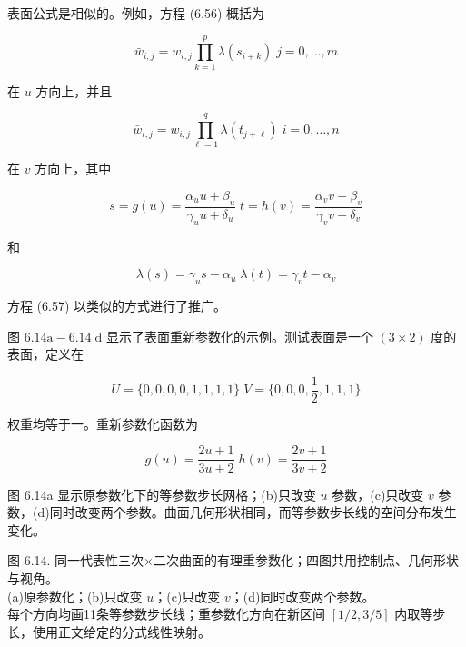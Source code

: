 \documentclass[../main.tex]{subfiles}
\begin{document}
表面公式是相似的。例如，方程 (6.56) 概括为

\[
{\bar{w}}_{i,j} = {w}_{i,j}\mathop{\prod }\limits_{{k = 1}}^{p}\lambda \left( {s}_{i + k}\right) \;j = 0,\ldots ,m
\]

在 \(u\) 方向上，并且

\[
{\bar{w}}_{i,j} = {w}_{i,j}\mathop{\prod }\limits_{{\ell  = 1}}^{q}\lambda \left( {t}_{j + \ell }\right) \;i = 0,\ldots ,n
\]

在 \(v\) 方向上，其中

\[
s = g\left( u\right)  = \frac{{\alpha }_{u}u + {\beta }_{u}}{{\gamma }_{u}u + {\delta }_{u}}\;t = h\left( v\right)  = \frac{{\alpha }_{v}v + {\beta }_{v}}{{\gamma }_{v}v + {\delta }_{v}}
\]

和

\[
\lambda \left( s\right)  = {\gamma }_{u}s - {\alpha }_{u}\;\lambda \left( t\right)  = {\gamma }_{v}t - {\alpha }_{v}
\]

方程 (6.57) 以类似的方式进行了推广。

图 \({6.14}\mathrm{a} - {6.14}\mathrm{\;d}\) 显示了表面重新参数化的示例。测试表面是一个 \(\left( {3 \times  2}\right)\) 度的表面，定义在

\[
U = \{ 0,0,0,0,1,1,1,1\} \;V = \{ 0,0,0,\frac{1}{2},1,1,1\}
\]

权重均等于一。重新参数化函数为

\[
g\left( u\right)  = \frac{{2u} + 1}{{3u} + 2}\;h\left( v\right)  = \frac{{2v} + 1}{{3v} + 2}
\]

图 6.14a 显示原参数化下的等参数步长网格；(b)只改变 $u$ 参数，(c)只改变 $v$ 参数，(d)同时改变两个参数。曲面几何形状相同，而等参数步长线的空间分布发生变化。






\begin{center}
\begin{minipage}{27cm}
\vspace*{.6\baselineskip}
\centering
{}
\par\vspace{.6\baselineskip}
\begin{minipage}[c]{12.5cm}
\centering
{}
\end{minipage}\hspace{.5cm}
\begin{minipage}[c]{12.5cm}
\centering
{}
\end{minipage}
\par\smallskip
图 6.14. 同一代表性三次$\times$二次曲面的有理重参数化；四图共用控制点、几何形状与视角。\\
(a)原参数化；(b)只改变 $u$；(c)只改变 $v$；(d)同时改变两个参数。\\
每个方向均画11条等参数步长线；重参数化方向在新区间 $[1/2,3/5]$ 内取等步长，使用正文给定的分式线性映射。
\end{minipage}
\end{center}
\end{document}
